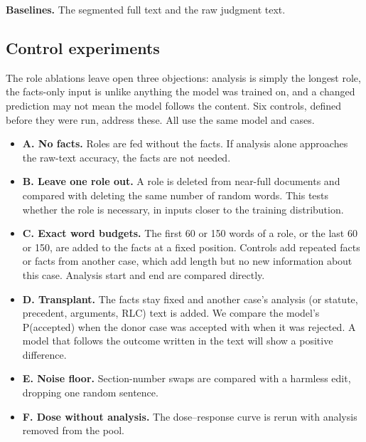 \documentclass[conference]{IEEEtran}
\begin{document}
\textbf{Baselines.} The segmented full text and the raw judgment text.

\subsection{Control experiments}
\label{sec:controls}
The role ablations leave open three objections: analysis is simply the longest role, the facts-only input is unlike anything the model was trained on, and a changed prediction may not mean the model follows the content. Six controls, defined before they were run, address these. All use the same model and cases.
\begin{itemize}[leftmargin=*]
    \item \textbf{A. No facts.} Roles are fed without the facts. If analysis alone approaches the raw-text accuracy, the facts are not needed.
    \item \textbf{B. Leave one role out.} A role is deleted from near-full documents and compared with deleting the same number of random words. This tests whether the role is necessary, in inputs closer to the training distribution.
    \item \textbf{C. Exact word budgets.} The first 60 or 150 words of a role, or the last 60 or 150, are added to the facts at a fixed position. Controls add repeated facts or facts from another case, which add length but no new information about this case. Analysis start and end are compared directly.
    \item \textbf{D. Transplant.} The facts stay fixed and another case's analysis (or statute, precedent, arguments, RLC) text is added. We compare the model's P(accepted) when the donor case was accepted with when it was rejected. A model that follows the outcome written in the text will show a positive difference.
    \item \textbf{E. Noise floor.} Section-number swaps are compared with a harmless edit, dropping one random sentence.
    \item \textbf{F. Dose without analysis.} The dose--response curve is rerun with analysis removed from the pool.
\end{itemize}
\end{document}
